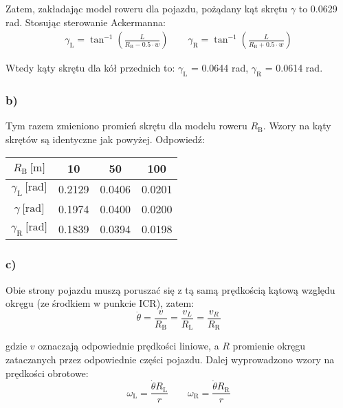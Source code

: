 \documentclass[11pt, a4paper]{article}
\begin{document}
Zatem, zakładając model roweru dla pojazdu, pożądany kąt skrętu $\gamma$ to 0.0629 rad. Stosując sterowanie Ackermanna:
\begin{gather*}
\gamma_{\text{L}} = \tan^{-1} \left(
	\frac{L}{R_{\text{B}} - 0.5 \cdot w}
	\right)
	\qquad
\gamma_{\text{R}} = \tan^{-1} \left(
	\frac{L}{R_{\text{B}} + 0.5 \cdot w}
	\right)
\end{gather*}

Wtedy kąty skrętu dla kół przednich to: $\gamma_{\text{L}}$ = 0.0644 rad, $\gamma_{\text{R}}$ = 0.0614 rad.

\subsubsection*{b)}

Tym razem zmieniono promień skrętu dla modelu roweru $R_{\text{B}}$. Wzory na kąty skrętów są identyczne jak powyżej. Odpowiedź:
\begin{table}[h!]
	\centering
	\begin{tabular}{c||c|c|c}
		$R_{\text{B}} \ \text{[m]}$ &
			10 & 50 & 100 \\
			\hline\hline
		$\gamma_{\text{L}} \ \text{[rad]}$ &
			0.2129 & 0.0406 & 0.0201 \\
			\hline
		$\gamma \ \text{[rad]}$ &
			0.1974 & 0.0400 & 0.0200 \\
			\hline
		$\gamma_{\text{R}} \ \text{[rad]}$ &
			0.1839 & 0.0394 & 0.0198
	\end{tabular}
\end{table}

\subsubsection*{c)}

Obie strony pojazdu muszą poruszać się z tą samą prędkością kątową względu okręgu (ze środkiem w punkcie ICR), zatem:
\begin{equation*}
\dot{\theta} =
	\frac{v}{R_{\text{B}}} =
	\frac{v_L}{R_{\text{L}}} =
	\frac{v_R}{R_{\text{R}}}
\end{equation*}

gdzie $v$ oznaczają odpowiednie prędkości liniowe, a $R$ promienie okręgu zataczanych przez odpowiednie części pojazdu. Dalej wyprowadzono wzory na prędkości obrotowe:
\begin{equation*}
\omega_{\text{L}} = \frac{\dot{\theta} R_{\text{L}}}{r}
	\qquad
\omega_{\text{R}} = \frac{\dot{\theta} R_{\text{R}}}{r}
\end{equation*}
\end{document}
